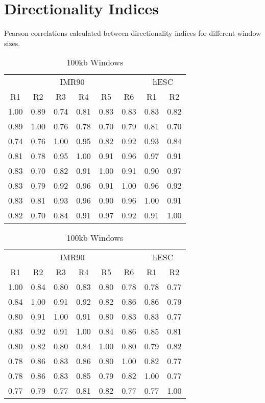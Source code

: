\newpage
\section*{Directionality Indices}\label{sec:SuppDirectionality}

Pearson correlations calculated between directionality indices for different window sizes.

\begin{table}[th]
  \caption{Directionality Indices}
  \parbox{.45\linewidth}{%
    \centering
    \caption{1Mb Windows}\label{tab:SuppDi1MBWindows}
    \begin{tabular}{*{8}{c}}
      \toprule
      \multicolumn{6}{c}{IMR90} & \multicolumn{2}{c}{hESC} \\
      R1 & R2 & R3 & R4 & R5 & R6 & R1 & R2 \\
      \midrule
      1.00 & 0.89 & 0.74 & 0.81 & 0.83 & 0.83 & 0.83 & 0.82 \\
      0.89 & 1.00 & 0.76 & 0.78 & 0.70 & 0.79 & 0.81 & 0.70 \\
      0.74 & 0.76 & 1.00 & 0.95 & 0.82 & 0.92 & 0.93 & 0.84 \\
      0.81 & 0.78 & 0.95 & 1.00 & 0.91 & 0.96 & 0.97 & 0.91 \\
      0.83 & 0.70 & 0.82 & 0.91 & 1.00 & 0.91 & 0.90 & 0.97 \\
      0.83 & 0.79 & 0.92 & 0.96 & 0.91 & 1.00 & 0.96 & 0.92 \\
      0.83 & 0.81 & 0.93 & 0.96 & 0.90 & 0.96 & 1.00 & 0.91 \\
      0.82 & 0.70 & 0.84 & 0.91 & 0.97 & 0.92 & 0.91 & 1.00 \\
      \bottomrule
    \end{tabular}
  }

  \hfill

  \parbox{.45\linewidth}{%
    \centering
    \caption{100kb Windows}\label{tab:SuppDi100kbWindows}
    \begin{tabular}{*{8}{c}}
      \toprule
      \multicolumn{6}{c}{IMR90} & \multicolumn{2}{c}{hESC} \\
      R1 & R2 & R3 & R4 & R5 & R6 & R1 & R2 \\
      \midrule
      1.00 & 0.84 & 0.80 & 0.83 & 0.80 & 0.78 & 0.78 & 0.77 \\
      0.84 & 1.00 & 0.91 & 0.92 & 0.82 & 0.86 & 0.86 & 0.79 \\
      0.80 & 0.91 & 1.00 & 0.91 & 0.80 & 0.83 & 0.83 & 0.77 \\
      0.83 & 0.92 & 0.91 & 1.00 & 0.84 & 0.86 & 0.85 & 0.81 \\
      0.80 & 0.82 & 0.80 & 0.84 & 1.00 & 0.80 & 0.79 & 0.82 \\
      0.78 & 0.86 & 0.83 & 0.86 & 0.80 & 1.00 & 0.82 & 0.77 \\
      0.78 & 0.86 & 0.83 & 0.85 & 0.79 & 0.82 & 1.00 & 0.77 \\
      0.77 & 0.79 & 0.77 & 0.81 & 0.82 & 0.77 & 0.77 & 1.00 \\
      \bottomrule
    \end{tabular}
  }
\end{table}
